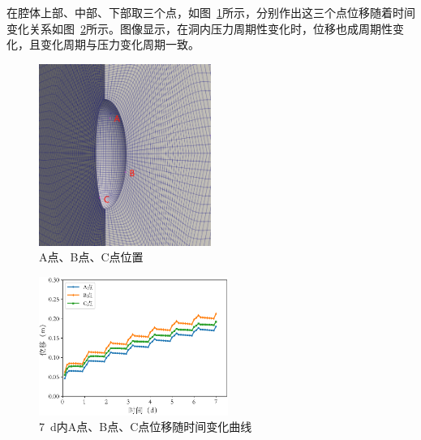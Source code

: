 在腔体上部、中部、下部取三个点，如图~\ref{fig:weizhi}所示，分别作出这三个点位移随着时间变化关系如图~\ref{fig:7d_displacement_A}所示。图像显示，在洞内压力周期性变化时，位移也成周期性变化，且变化周期与压力变化周期一致。

\begin{figure}[ht!]
    \centering
    \includegraphics[width=0.5\textwidth]{img/chap5/三点位移.png}
    \caption{A点、B点、C点位置}
    \label{fig:weizhi}
\end{figure}


\begin{figure}[ht!]
    \centering
    \includegraphics[width=0.55\textwidth]{img/chap5/三点位移随时间变化曲线.pdf}
    \caption{\SI{7}{d}内A点、B点、C点位移随时间变化曲线}
    \label{fig:7d_displacement_A}
\end{figure}

